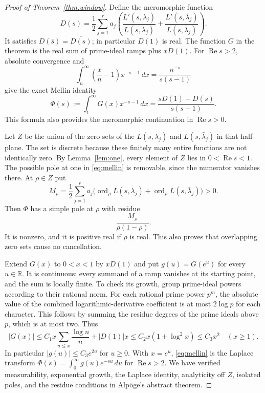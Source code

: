 \documentclass[11pt]{article}
\newcommand{\Rea}{\operatorname{Re}}
\newcommand{\ord}{\operatorname{ord}}
\theoremstyle{definition}
\theoremstyle{remark}
\begin{document}
\begin{proof}[Proof of Theorem~\ref{thm:window}]
Define the meromorphic function
\[
 D(s)=\frac12\sum_{j=1}^r a_j
 \left(\frac{L'(s,\lambda_j)}{L(s,\lambda_j)}+
       \frac{L'(s,\bar\lambda_j)}{L(s,\bar\lambda_j)}\right).
\]
It satisfies $D(\bar s)=\overline{D(s)}$; in particular $D(1)$ is real.
The function $G$ in the theorem is the real sum of prime-ideal ramps
plus $xD(1)$.  For $\Rea s>2$, absolute convergence and
\[
 \int_n^\infty\left(\frac{x}{n}-1\right)x^{-s-1}\,dx
       =\frac{n^{-s}}{s(s-1)}
\]
give the exact Mellin identity
\begin{equation}\label{eq:mellin}
 \Phi(s):=\int_1^\infty G(x)x^{-s-1}\,dx
       =\frac{sD(1)-D(s)}{s(s-1)}.
\end{equation}
This formula also provides the meromorphic continuation in $\Rea s>0$.

Let $Z$ be the union of the zero sets of the $L(s,\lambda_j)$ and
$L(s,\bar\lambda_j)$ in that half-plane.  The set is discrete because
these finitely many entire functions are not identically zero.  By
Lemma~\ref{lem:one}, every element of $Z$ lies in $0<\Rea s<1$.
The possible pole at one in \eqref{eq:mellin} is removable, since the
numerator vanishes there.  At $\rho\in Z$ put
\[
 M_\rho=\frac12\sum_{j=1}^r a_j
      \bigl(\ord_\rho L(s,\lambda_j)+
                         \ord_\rho L(s,\bar\lambda_j)\bigr)>0.
\]
Then $\Phi$ has a simple pole at $\rho$ with residue
\begin{equation}\label{eq:residue}
             \frac{M_\rho}{\rho(1-\rho)}.
\end{equation}
It is nonzero, and it is positive real if $\rho$ is real.  This also
proves that overlapping zero sets cause no cancellation.

Extend $G(x)$ to $0<x<1$ by $xD(1)$ and put $g(u)=G(e^u)$ for every
$u\in\mathbb R$.  It is continuous: every summand of a ramp vanishes
at its starting point, and the sum is locally finite.  To check its
growth, group prime-ideal powers according to their rational norm.  For
each rational prime power $p^m$, the absolute value of the combined
logarithmic-derivative coefficient is at most $2\log p$ for each
character.  This follows by summing the residue degrees of the prime
ideals above $p$, which is at most two.  Thus
\[
 |G(x)|\leq C_1x\sum_{n\leq x}\frac{\log n}{n}+|D(1)|x
       \leq C_2x(1+\log^2x)\leq C_3x^2\quad(x\geq1).
\]
In particular $|g(u)|\leq C_3e^{2u}$ for $u\geq0$.  With $x=e^u$,
\eqref{eq:mellin} is the Laplace transform
$\Phi(s)=\int_0^\infty g(u)e^{-su}\,du$ for $\Rea s>2$.
We have verified measurability, exponential growth, the Laplace identity,
analyticity off $Z$, isolated poles, and the residue conditions in
Alp\"oge's abstract theorem.


\end{proof}
\end{document}

